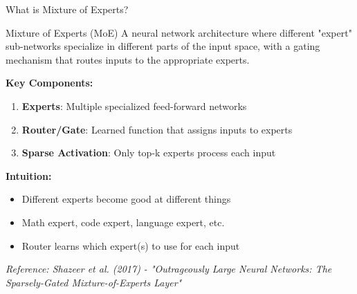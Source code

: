 \documentclass[aspectratio=169]{beamer}
\begin{document}
\begin{frame}[shrink=10]{What is Mixture of Experts? 🧠}
\begin{block}{Mixture of Experts (MoE)}
A neural network architecture where different "expert" sub-networks specialize in different parts of the input space, with a gating mechanism that routes inputs to the appropriate experts.
\end{block}

\vspace{0.5em}

\textbf{Key Components:}
\begin{enumerate}\setlength{\itemsep}{0pt}
    \item \textbf{Experts}: Multiple specialized feed-forward networks
    \item \textbf{Router/Gate}: Learned function that assigns inputs to experts
    \item \textbf{Sparse Activation}: Only top-k experts process each input
\end{enumerate}

\vspace{0.5em}

\textbf{Intuition:}
\begin{itemize}\setlength{\itemsep}{0pt}
    \item Different experts become good at different things
    \item Math expert, code expert, language expert, etc.
    \item Router learns which expert(s) to use for each input
\end{itemize}

\vspace{0.3em}
\small
\textit{Reference: Shazeer et al. (2017) - "Outrageously Large Neural Networks: The Sparsely-Gated Mixture-of-Experts Layer"}
\end{frame}
\end{document}
